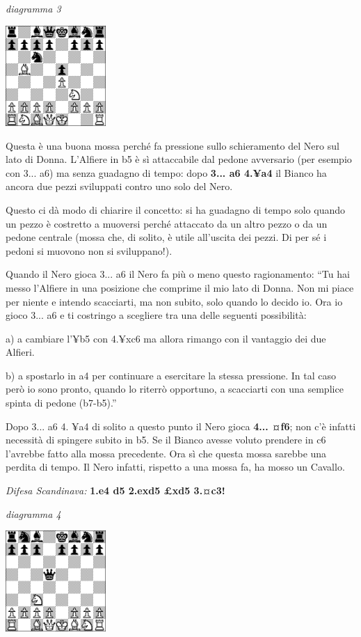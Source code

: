 \documentclass[
]{article}
\begin{document}
\emph{diagramma 3}

\includegraphics[width=1.50417in,height=1.50417in]{vertopal_109f12be458a423d8f3cc838880eaea2/media/image3.png}

Questa è una buona mossa perché fa pressione sullo schieramento del Nero
sul lato di Donna. L'Alfiere in b5 è sì attaccabile dal pedone
avversario (per esempio con 3... a6) ma senza guadagno di tempo: dopo
\textbf{3... a6 4.¥a4} il Bianco ha ancora due pezzi sviluppati contro
uno solo del Nero.

Questo ci dà modo di chiarire il concetto: si ha guadagno di tempo solo
quando un pezzo è costretto a muoversi perché attaccato da un altro
pezzo o da un pedone centrale (mossa che, di solito, è utile all'uscita
dei pezzi.
Di per sé i pedoni si muovono non si sviluppano!).

Quando il Nero gioca 3... a6 il Nero fa più o meno questo ragionamento:
``Tu hai messo l'Alfiere in una posizione che comprime il mio lato di
Donna. Non mi piace per niente e intendo scacciarti, ma non subito, solo
quando lo decido io. Ora io gioco 3... a6 e ti costringo a scegliere tra
una delle seguenti possibilità:

a) a cambiare l'¥b5 con 4.¥xc6 ma allora rimango con il vantaggio dei
due Alfieri.

b) a spostarlo in a4 per continuare a esercitare la stessa pressione. In
tal caso però io sono pronto, quando lo riterrò opportuno, a scacciarti
con una semplice spinta di pedone (b7-b5).''

Dopo 3... a6 4. ¥a4 di solito a questo punto il Nero gioca \textbf{4...
¤f6}; non c'è infatti necessità di spingere subito in b5. Se il Bianco
avesse voluto prendere in c6 l'avrebbe fatto alla mossa precedente. Ora
sì che questa mossa sarebbe una perdita di tempo. Il Nero infatti,
rispetto a una mossa fa, ha mosso un Cavallo.

\emph{Difesa Scandinava:} \textbf{1.e4 d5 2.exd5 £xd5 3.¤c3!}

\emph{diagramma 4}

\includegraphics[width=1.50417in,height=1.50417in]{vertopal_109f12be458a423d8f3cc838880eaea2/media/image4.png}
\end{document}

